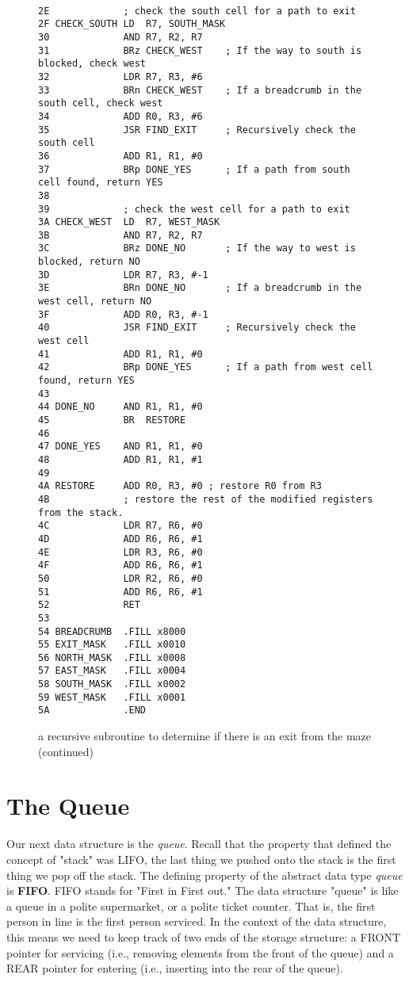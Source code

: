 \documentclass{patt}
\begin{document}
\begin{figure}[h!]
\begin{minipage}{36pc}
\begin{Verbatim}[fontsize=\fontsize{9}{11}\selectfont]

2E             ; check the south cell for a path to exit
2F CHECK_SOUTH LD  R7, SOUTH_MASK
30             AND R7, R2, R7
31             BRz CHECK_WEST    ; If the way to south is blocked, check west
32             LDR R7, R3, #6
33             BRn CHECK_WEST    ; If a breadcrumb in the south cell, check west
34             ADD R0, R3, #6
35             JSR FIND_EXIT     ; Recursively check the south cell
36             ADD R1, R1, #0
37             BRp DONE_YES      ; If a path from south cell found, return YES
38
39             ; check the west cell for a path to exit
3A CHECK_WEST  LD  R7, WEST_MASK
3B             AND R7, R2, R7
3C             BRz DONE_NO       ; If the way to west is blocked, return NO
3D             LDR R7, R3, #-1
3E             BRn DONE_NO       ; If a breadcrumb in the west cell, return NO
3F             ADD R0, R3, #-1
40             JSR FIND_EXIT     ; Recursively check the west cell
41             ADD R1, R1, #0
42             BRp DONE_YES      ; If a path from west cell found, return YES
43 
44 DONE_NO     AND R1, R1, #0
45             BR  RESTORE
46 
47 DONE_YES    AND R1, R1, #0
48             ADD R1, R1, #1
49 
4A RESTORE     ADD R0, R3, #0 ; restore R0 from R3
4B             ; restore the rest of the modified registers from the stack.
4C             LDR R7, R6, #0
4D             ADD R6, R6, #1
4E             LDR R3, R6, #0
4F             ADD R6, R6, #1
50             LDR R2, R6, #0
51             ADD R6, R6, #1
52             RET
53 
54 BREADCRUMB  .FILL x8000
55 EXIT_MASK   .FILL x0010
56 NORTH_MASK  .FILL x0008
57 EAST_MASK   .FILL x0004
58 SOUTH_MASK  .FILL x0002
59 WEST_MASK   .FILL x0001
5A             .END
\end{Verbatim}
\caption{a recursive subroutine to determine if there is an exit from the maze (continued)}
\label{fig:xxxxx}
\end{minipage}
\end{figure}

\section{The Queue}

Our next data structure is the {\em queue}.
Recall that the property that defined the concept of "stack" was LIFO, the last
thing we pushed onto the stack is the first thing we pop off the stack.  
The defining property of the abstract data type {\em queue} is {\bf FIFO}.  
FIFO stands for "First in First out."  The data structure "queue" is like a
queue in a polite supermarket, or a polite ticket counter.  That is, the first 
person in line is the first person serviced.  In the context of the data
structure, this means we need to keep track of two ends of the storage 
structure: a FRONT pointer for servicing (i.e., removing elements from the 
front of the queue) and a REAR pointer for entering (i.e., inserting into the 
rear of the queue).
\end{document}
